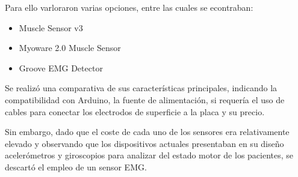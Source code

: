 Para ello varloraron varias opciones, entre las cuales se econtraban:

\begin{itemize}
    \item Muscle Sensor v3
    \item Myoware 2.0 Muscle Sensor
    \item Groove EMG Detector
\end{itemize}

Se realizó una comparativa de sus características principales, indicando la compatibilidad con Arduino, la fuente de alimentación, si requería el uso de cables para conectar los electrodos de superficie a la placa y su precio. 

Sin embargo, dado que el coste de cada uno de los sensores era relativamente elevado y observando que los dispositivos actuales presentaban en su diseño acelerómetros y giroscopios para analizar del estado motor de los pacientes, se descartó el empleo de un sensor EMG.


